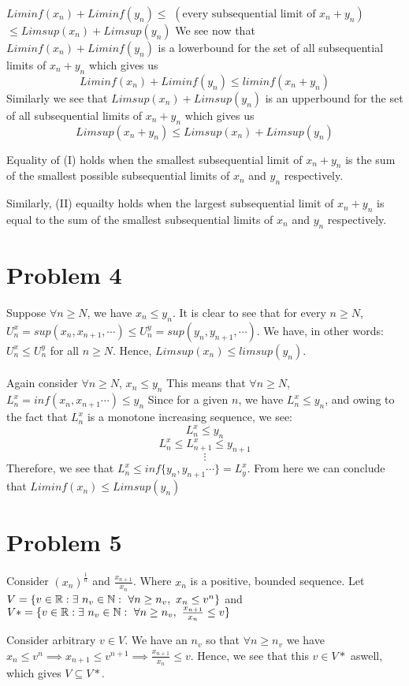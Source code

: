 \documentclass[../Main.tex]{subfiles}
\begin{document}
$Liminf(x_n)+Liminf(y_n)\leq$ $(\text{every subsequential limit of } x_n+y_n)$ $\leq Limsup(x_n)+Limsup(y_n) $
We see now that $Liminf(x_n)+Liminf(y_n)$ is a lowerbound
for the set of all subsequential limits of $x_n+y_n$ 
which gives us $$Liminf(x_n)+Liminf(y_n)\leq liminf(x_n+y_n) $$
Similarly we see that $Limsup(x_n)+Limsup(y_n)$ is an upperbound
for the set of all subsequential limits of $x_n+y_n$
which gives us $$Limsup(x_n+y_n) \leq Limsup(x_n)+Limsup(y_n) $$

Equality of (I) holds when the smallest subsequential limit of $x_n+y_n$ is the sum
of the smallest possible subsequential limits of $x_n$ and $y_n$ respectively. 

Similarly, (II) equailty holds when the largest subsequential
limit of $x_n+y_n$ is equal to the sum of the smallest
subsequential limits of $x_n$ and $y_n$ respectively.

\section{Problem 4}
Suppose $\forall n \geq N$, we have $x_n \leq y_n$. 
It is clear to see that for every $n \geq N$, $U_n^x=sup(x_n,x_{n+1},\cdots)\leq 
U_n^y=sup(y_n,y_{n+1},\cdots)$. We have, in other words:
$U_n^x \leq U_n^y$ for all $n \geq N$. Hence, $Limsup(x_n)\leq limsup(y_n)$.
\\\\ Again consider $\forall n \geq N$, $x_n \leq y_n$
This means that $\forall n \geq N$, $L_n^x= inf(x_n,x_{n+1}\cdots) \leq y_n$
Since for a given $n$, we have $L_n^x \leq y_n$, and owing 
to the fact that $L_n^x$ is a monotone increasing sequence, we
see:
$$L_n^x\leq y_n $$
$$L_n^x \leq L_{n+1}^x \leq y_{n+1} $$
$$\vdots $$
Therefore, we see that $L_n^x \leq inf\{y_n,y_{n+1}\cdots\}=L_y^x$.
From here we can conclude that $Liminf(x_n) \leq Limsup(y_n)$

\section{Problem 5}
Consider $(x_n)^{\frac{1}{n}}$ and $\frac{x_{n+1}}{x_n}$. Where $x_n$ is a positive, bounded sequence.
Let $V=\{v \in \mathbb R: \exists \ n_v \in \mathbb N : \ \forall n \geq n_v, \ x_n \leq v^n \}$
and $V*=\{v \in \mathbb R: \exists \ n_v \in \mathbb N : \ \forall n \geq n_v, \ \frac{x_{n+1}}{x_n} \leq v \}$

Consider arbitrary $v \in V$. We have an $n_v$ so that $\forall n \geq n_v$
we have $x_n \leq v^n \implies x_{n+1} \leq v^{n+1} \implies \frac{x_{n+1}}{x_n}\leq v$.
Hence, we see that this $v \in V*$ aswell, which gives $V \subseteq V*$.
\end{document}
